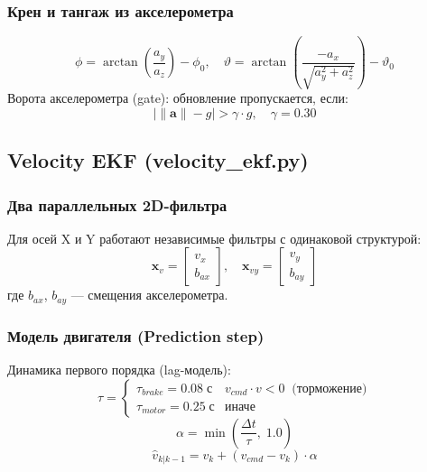 \documentclass[12pt, a4paper]{article}
\newcommand{\norm}[1]{\left\lVert#1\right\rVert}
\begin{document}
\subsubsection{Крен и тангаж из акселерометра}
\begin{equation}
  \phi = \arctan\!\left(\frac{a_y}{a_z}\right) - \phi_0, \quad
  \vartheta = \arctan\!\left(\frac{-a_x}{\sqrt{a_y^2 + a_z^2}}\right) - \vartheta_0
\end{equation}
Ворота акселерометра (gate): обновление пропускается, если:
\begin{equation}
  \bigl|\norm{\mathbf{a}} - g\bigr| > \gamma \cdot g, \quad \gamma = 0.30
\end{equation}

\subsection{Velocity EKF (velocity\_ekf.py)}
\label{sec:vel_ekf}

\subsubsection{Два параллельных 2D-фильтра}
Для осей X и Y работают независимые фильтры с одинаковой структурой:
\begin{equation}
  \mathbf{x}_v = \begin{bmatrix} v_x \\ b_{ax} \end{bmatrix}, \quad
  \mathbf{x}_{vy} = \begin{bmatrix} v_y \\ b_{ay} \end{bmatrix}
\end{equation}
где $b_{ax}$, $b_{ay}$ — смещения акселерометра.

\subsubsection{Модель двигателя (Prediction step)}
Динамика первого порядка (lag-модель):
\begin{equation}
  \tau =
  \begin{cases}
    \tau_{brake} = 0.08\;\text{с} & v_{cmd} \cdot v < 0 \;\;\text{(торможение)} \\
    \tau_{motor} = 0.25\;\text{с} & \text{иначе}
  \end{cases}
\end{equation}
\begin{equation}
  \alpha = \min\!\left(\frac{\Delta t}{\tau},\; 1.0\right)
\end{equation}
\begin{equation}
  \hat{v}_{k|k-1} = v_k + (v_{cmd} - v_k)\cdot\alpha
\end{equation}
\end{document}
